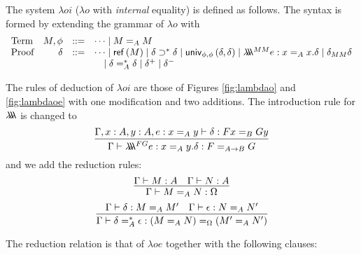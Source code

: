 The system $\lambda o i$ ($\lambda o$ with \emph{internal} equality) is defined as follows.  The
syntax is formed by extending the grammar of $\lambda o$ with
\[
\begin{array}{lrcl}
\text{Term} & M, \phi & ::= & \cdots \mid M =_A M \\
\text{Proof} & \delta & ::= & \cdots \mid \mathsf{ref} \left( {M} \right) \mid \delta \supset^* \delta \mid \mathsf{univ}_{{\phi} , {\phi}} \left( {\delta} , {\delta} \right) \mid \lambda \!\! \lambda \!\! \lambda^{MM} e : x =_A x . \delta \mid \delta_{MM} \delta\\
& & & \quad \mid \delta =^*_A \delta \mid \delta^+ \mid \delta^-
\end{array}
\]

The rules of deduction of $\lambda o i$ are those of Figures \ref{fig:lambdao} and \ref{fig:lambdaoe} with one modification and two additions.  The introduction rule for $\lambda \!\! \lambda \!\! \lambda$ is changed to %
\[ \infer{\Gamma \vdash \triplelambda^{FG} e : x =_A y . \delta : F =_{A \rightarrow B} G}
{\Gamma, x : A, y : A, e : x =_A y \vdash \delta : F x =_B G y} \]
and we add the reduction rules:
\[ \infer{\Gamma \vdash M =_A N : \Omega}{\Gamma \vdash M : A \quad \Gamma \vdash N : A} \]
\[ \infer{\Gamma \vdash \delta =^*_A \epsilon : (M =_A N) =_\Omega (M' =_A N')}
{\Gamma \vdash \delta : M =_A M' \quad \Gamma \vdash \epsilon : N =_A N'} \]

The reduction relation is that of $\lambda o e$ together with the following clauses:

